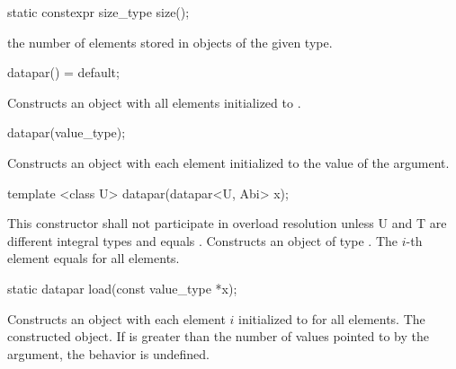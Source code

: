 \begin{wgText}

  \begin{itemdecl}
static constexpr size_type size();
  \end{itemdecl}
  \begin{itemdescr}
    \pnum\returns the number of elements stored in objects of the given \datapar[<T, Abi>] type.
  \end{itemdescr}

  \begin{itemdecl}
datapar() = default;
  \end{itemdecl}
  \begin{itemdescr}
    \pnum
    \effects
    Constructs an object with all elements initialized to .
  \end{itemdescr}

  \begin{itemdecl}
datapar(value_type);
  \end{itemdecl}
  \begin{itemdescr}
    \pnum
    \effects
    Constructs an object with each element initialized to the value of the argument.
  \end{itemdescr}

  \begin{itemdecl}
template <class U> datapar(datapar<U, Abi> x);
  \end{itemdecl}
  \begin{itemdescr}
    \pnum\remarks This constructor shall not participate in overload resolution unless
                  \type U and \type T are different integral types and
                   equals .
    \pnum\effects Constructs an object of type \datapar.
    \pnum\postcondition The $i$-th element equals  for all elements.
  \end{itemdescr}

  \begin{itemdecl}
static datapar load(const value_type *x);
  \end{itemdecl}
  \begin{itemdescr}
    \pnum \effects Constructs an object with each element $i$ initialized to  for all elements.
    \pnum \returns The constructed object.
    \pnum \remarks If \datapar{} is greater than the number of values pointed to by the argument, the behavior is undefined.
  \end{itemdescr}


\end{wgText}
